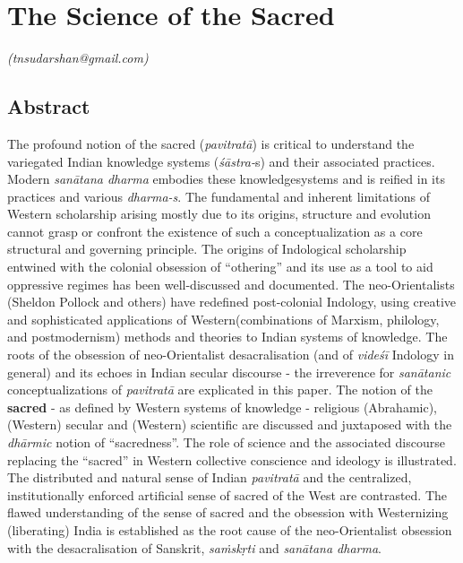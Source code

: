
\chapter{The Science of the Sacred}\label{chapter9}


\begin{flushright}
\textit{(tnsudarshan@gmail.com)}
\end{flushright}


\section*{Abstract}

The profound notion of the sacred (\textit{pavitratā}) is critical to understand the variegated Indian knowledge systems (\textit{śāstra-}s) and their associated practices. Modern \textit{sanātana dharma } embodies these knowledge\break systems and is reified in its practices and various \textit{dharma-s}. The fundamental and inherent limitations of Western scholarship arising mostly due to its origins, structure and evolution cannot grasp or confront the existence of such a conceptualization as a core structural and governing principle. The origins of Indological scholarship entwined with the colonial obsession of “othering” and its use as a tool to aid oppressive regimes has been well-discussed and documented. The neo-Orientalists (Sheldon Pollock and others) have redefined post-colonial Indology, using creative and sophisticated applications of Western\break (combinations of Marxism, philology, and postmodernism) methods and theories to Indian systems of knowledge. The roots of the obsession of neo-Orientalist desacralisation (and of \textit{videśī} Indology in general) and its echoes in Indian secular discourse - the irreverence for \textit{sanātanic} conceptualizations of \textit{pavitratā} are explicated in this paper. The notion of the \textbf{sacred} - as defined by Western systems of knowledge - religious (Abrahamic), (Western) secular and (Western) scientific are discussed and juxtaposed with the \textit{dhārmic} notion of “sacredness”. The role of science and the associated discourse replacing the “sacred” in Western collective conscience and ideology is illustrated. The distributed and natural sense of Indian \textit{pavitratā} and the centralized, institutionally enforced artificial sense of sacred of the West are contrasted. The flawed understanding of the sense of sacred and the obsession with Westernizing (liberating) India is established as the root cause of the neo-Orientalist obsession with the desacralisation of Sanskrit, \textit{saṁskṛti} and \textit{sanātana dharma}.


